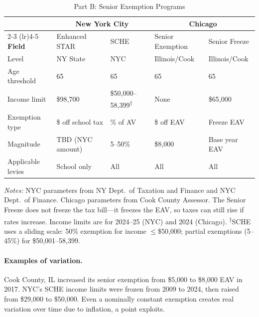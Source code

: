 \documentclass[11pt]{article}
\begin{document}
\begin{table}[htbp!]
\centering
\caption{Part B: Senior Exemption Programs}
\label{tab:exemptions_comparison}
\small
\begin{tabular}{lllll}
\toprule
& \multicolumn{2}{c}{\textbf{New York City}} & \multicolumn{2}{c}{\textbf{Chicago}} \\
\cmidrule(lr){2-3} \cmidrule(lr){4-5}
\textbf{Field} & Enhanced STAR & SCHE & Senior Exemption & Senior Freeze \\
\midrule
Level & NY State & NYC & Illinois/Cook & Illinois/Cook \\
Age threshold & 65 & 65 & 65 & 65 \\
Income limit & \$98,700 & \$50,000--58,399\textsuperscript{$\dagger$} & None & \$65,000 \\
Exemption type & \$ off school tax & \% of AV & \$ off EAV & Freeze EAV \\
Magnitude & TBD (NYC amount) & 5--50\% & \$8,000 & Base year EAV \\
Applicable levies & School only & All & All & All \\
\bottomrule
\end{tabular}

\vspace{0.5em}
\raggedright
\footnotesize
\textit{Notes:} NYC parameters from NY Dept.\ of Taxation and Finance and NYC Dept.\ of Finance. Chicago parameters from Cook County Assessor. The Senior Freeze does not freeze the tax bill---it freezes the EAV, so taxes can still rise if rates increase. Income limits are for 2024--25 (NYC) and 2024 (Chicago). \textsuperscript{$\dagger$}SCHE uses a sliding scale: 50\% exemption for income $\leq$\$50,000; partial exemptions (5--45\%) for \$50,001--58,399.
\end{table}

\paragraph{Examples of variation.}  Cook County, IL increased its senior exemption from \$5,000 to \$8,000 EAV in 2017. NYC's SCHE income limits were frozen from 2009 to 2024, then raised from \$29,000 to \$50,000. Even a nominally constant exemption creates real variation over time due to inflation, a point \citet{saez2003effect} exploits.

\end{document}
